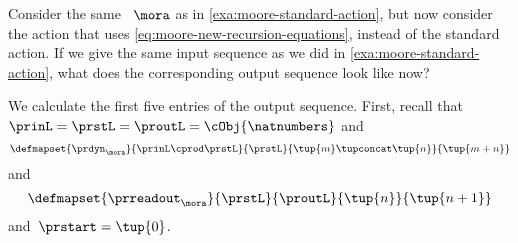 \begin{example}
    \label{exa:moore-non-standard-action-on-sequences}
    Consider the same ~$\mora$ as in \cref{exa:moore-standard-action}, but now consider the action that uses \cref{eq:moore-new-recursion-equations}, instead of the standard action.
    If we give the same input sequence as we did in \cref{exa:moore-standard-action}, what does the corresponding output sequence look like now?

    We calculate the first five entries of the output sequence.
    First, recall that~$\prinL = \prstL = \proutL = \cObj{\natnumbers}$ and
    \begin{equation}
        \defmapset{
            \prdyn_\mora
        }{
            \prinL \cprod \prstL
        }{
            \prstL
        }{
            \tup{m} \tupconcat \tup{n}
        }{
            \tup{m + n}
        }
    \end{equation}
    and
    \begin{equation}
        \defmapset{
            \prreadout_\mora
        }{
            \prstL
        }{
            \proutL
        }{
            \tup{n}
        }{
            \tup{n+1}
        }
    \end{equation}
    and~$\prstart = \tup{0}$.


\end{example}
